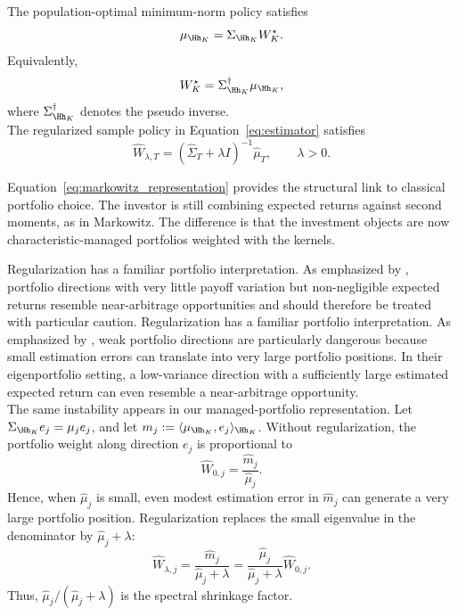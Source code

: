 \begin{proposition}
\label{prop:managed_markowitz}

The population-optimal minimum-norm policy satisfies
\begin{equation}
\mu_{\Hh_K}
=
\Sigma_{\Hh_K} W_K^\star.
\label{eq:population_markowitz_representation}
\end{equation}
Equivalently,
\[
W_K^\star
=
\Sigma_{\Hh_K}^{\dagger}\mu_{\Hh_K},
\]
where $\Sigma_{\Hh_K}^{\dagger}$ denotes the pseudo inverse.\\
The regularized sample policy in Equation~\eqref{eq:estimator} satisfies
\begin{equation}
\widehat W_{\lambda,T}
=
\left(
\widehat\Sigma_T+\lambda I
\right)^{-1}
\widehat\mu_T,
\qquad
\lambda>0.
\label{eq:markowitz_representation}
\end{equation}

\end{proposition}

Equation~\eqref{eq:markowitz_representation} provides the structural link to
classical portfolio choice. The investor is still combining expected returns
against second moments, as in Markowitz. The difference is that the investment
objects are now characteristic-managed portfolios weighted with the kernels.

Regularization has a familiar portfolio interpretation. As emphasized by
\citet{kozaknagelsantosh2020}, portfolio directions with very little payoff
variation but non-negligible expected returns resemble near-arbitrage
opportunities and should therefore be treated with particular caution.
Regularization has a familiar portfolio interpretation. As emphasized by
\citet{kozaknagelsantosh2020}, weak portfolio directions are particularly
dangerous because small estimation errors can translate into very large
portfolio positions. In their eigenportfolio setting, a low-variance direction
with a sufficiently large estimated expected return can even resemble a
near-arbitrage opportunity.\\
The same instability appears in our managed-portfolio representation. Let
$\Sigma_{\Hh_K}e_j=\mu_j e_j$, and let
$m_j:=\langle\mu_{\Hh_K},e_j\rangle_{\Hh_K}$.
Without regularization, the portfolio weight along direction $e_j$ is
proportional to
\[
\widehat W_{0,j}
=
\frac{\widehat m_j}{\widehat\mu_j}.
\]
Hence, when $\widehat\mu_j$ is small, even modest estimation error in
$\widehat m_j$ can generate a very large portfolio position. Regularization
replaces the small eigenvalue in the denominator by
$\widehat\mu_j+\lambda$:
\[
\widehat W_{\lambda,j}
=
\frac{\widehat m_j}{\widehat\mu_j+\lambda}
=
\frac{\widehat\mu_j}{\widehat\mu_j+\lambda}
\widehat W_{0,j}.
\]
Thus, $\widehat\mu_j/(\widehat\mu_j+\lambda)$ is the spectral shrinkage factor.


